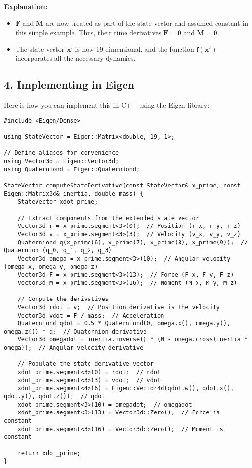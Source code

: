\documentclass{article}
\begin{document}
\textbf{Explanation:}
\begin{itemize}
    \item \(\mathbf{F}\) and \(\mathbf{M}\) are now treated as part of the state vector and assumed constant in this simple example. Thus, their time derivatives \(\dot{\mathbf{F}} = \mathbf{0}\) and \(\dot{\mathbf{M}} = \mathbf{0}\).
    \item The state vector \(\mathbf{x}'\) is now 19-dimensional, and the function \(\mathbf{f}(\mathbf{x}')\) incorporates all the necessary dynamics.
\end{itemize}

\subsection*{4. Implementing in Eigen}

Here is how you can implement this in C++ using the Eigen library:

\begin{verbatim}
#include <Eigen/Dense>

using StateVector = Eigen::Matrix<double, 19, 1>;

// Define aliases for convenience
using Vector3d = Eigen::Vector3d;
using Quaterniond = Eigen::Quaterniond;

StateVector computeStateDerivative(const StateVector& x_prime, const Eigen::Matrix3d& inertia, double mass) {
    StateVector xdot_prime;

    // Extract components from the extended state vector
    Vector3d r = x_prime.segment<3>(0);  // Position (r_x, r_y, r_z)
    Vector3d v = x_prime.segment<3>(3);  // Velocity (v_x, v_y, v_z)
    Quaterniond q(x_prime(6), x_prime(7), x_prime(8), x_prime(9));  // Quaternion (q_0, q_1, q_2, q_3)
    Vector3d omega = x_prime.segment<3>(10);  // Angular velocity (omega_x, omega_y, omega_z)
    Vector3d F = x_prime.segment<3>(13);  // Force (F_x, F_y, F_z)
    Vector3d M = x_prime.segment<3>(16);  // Moment (M_x, M_y, M_z)

    // Compute the derivatives
    Vector3d rdot = v;  // Position derivative is the velocity
    Vector3d vdot = F / mass;  // Acceleration
    Quaterniond qdot = 0.5 * Quaterniond(0, omega.x(), omega.y(), omega.z()) * q;  // Quaternion derivative
    Vector3d omegadot = inertia.inverse() * (M - omega.cross(inertia * omega));  // Angular velocity derivative

    // Populate the state derivative vector
    xdot_prime.segment<3>(0) = rdot;  // rdot
    xdot_prime.segment<3>(3) = vdot;  // vdot
    xdot_prime.segment<4>(6) = Eigen::Vector4d(qdot.w(), qdot.x(), qdot.y(), qdot.z());  // qdot
    xdot_prime.segment<3>(10) = omegadot;  // omegadot
    xdot_prime.segment<3>(13) = Vector3d::Zero();  // Force is constant
    xdot_prime.segment<3>(16) = Vector3d::Zero();  // Moment is constant

    return xdot_prime;
}
\end{verbatim}
\end{document}
